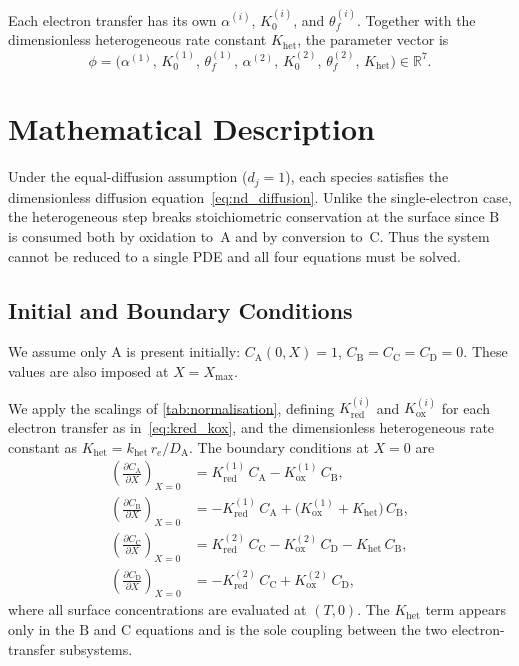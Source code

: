 Each electron transfer has its own $\alpha^{(i)}$, $K_0^{(i)}$, and
$\theta_f^{(i)}$. Together with the dimensionless heterogeneous rate
constant $K_{\mathrm{het}}$, the parameter vector is
\begin{equation}\label{eq:het-params}
  \phi = \bigl(\alpha^{(1)},\, K_0^{(1)},\, \theta_f^{(1)},\,
    \alpha^{(2)},\, K_0^{(2)},\, \theta_f^{(2)},\,
  K_{\mathrm{het}}\bigr) \in \mathbb{R}^7.
\end{equation}

\section{Mathematical Description}\label{sec:het-maths}

Under the equal-diffusion assumption ($d_j = 1$), each species satisfies
the dimensionless diffusion equation~\cref{eq:nd_diffusion}. Unlike the
single-electron case, the heterogeneous step breaks stoichiometric
conservation at the surface since $\mathrm{B}$ is consumed both by
oxidation to~$\mathrm{A}$ and by conversion to~$\mathrm{C}$. Thus the
system cannot be reduced to a single PDE and all four equations must be
solved.

\subsection{Initial and Boundary Conditions}

We assume only $\mathrm{A}$ is present initially:
$C_\mathrm{A}(0,X) = 1$, $C_\mathrm{B} = C_\mathrm{C} = C_\mathrm{D}
= 0$. These values are also imposed at $X = X_{\max}$.

We apply the scalings of \cref{tab:normalisation}, defining
$K_{\mathrm{red}}^{(i)}$ and $K_{\mathrm{ox}}^{(i)}$ for each electron
transfer as in~\cref{eq:kred_kox}, and the dimensionless heterogeneous
rate constant as $K_{\mathrm{het}} = k_{\mathrm{het}}\, r_e /
D_\mathrm{A}$. The boundary conditions at $X = 0$
are~\cite{compton2014understanding}
\begin{equation}\label{eq:het-bc-nondim}
  \begin{aligned}
    \left(\frac{\partial C_\mathrm{A}}{\partial X}\right)_{X=0}
    &= K_{\mathrm{red}}^{(1)}\, C_\mathrm{A}
    - K_{\mathrm{ox}}^{(1)}\, C_\mathrm{B}, \\[4pt]
    \left(\frac{\partial C_\mathrm{B}}{\partial X}\right)_{X=0}
    &= -K_{\mathrm{red}}^{(1)}\, C_\mathrm{A}
    + \bigl(K_{\mathrm{ox}}^{(1)} + K_{\mathrm{het}}\bigr)\,
    C_\mathrm{B}, \\[4pt]
    \left(\frac{\partial C_\mathrm{C}}{\partial X}\right)_{X=0}
    &= K_{\mathrm{red}}^{(2)}\, C_\mathrm{C}
    - K_{\mathrm{ox}}^{(2)}\, C_\mathrm{D}
    - K_{\mathrm{het}}\, C_\mathrm{B}, \\[4pt]
    \left(\frac{\partial C_\mathrm{D}}{\partial X}\right)_{X=0}
    &= -K_{\mathrm{red}}^{(2)}\, C_\mathrm{C}
    + K_{\mathrm{ox}}^{(2)}\, C_\mathrm{D},
  \end{aligned}
\end{equation}
where all surface concentrations are evaluated at $(T, 0)$. The
$K_{\mathrm{het}}$ term appears only in the $\mathrm{B}$ and $\mathrm{C}$
equations and is the sole coupling between the two electron-transfer
subsystems.

